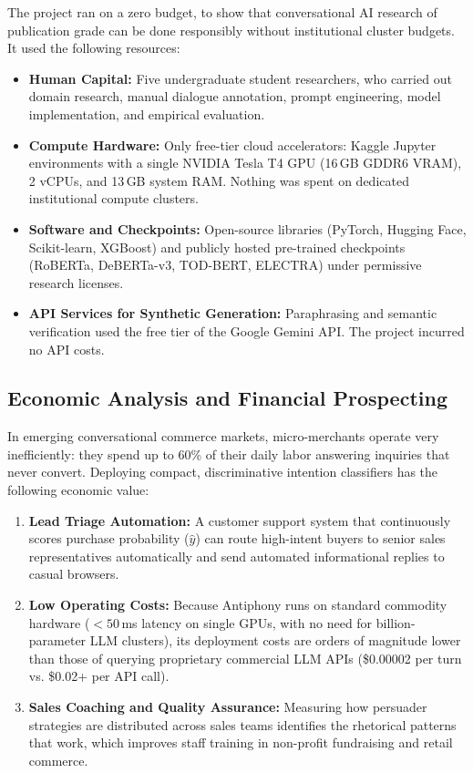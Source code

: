 \begin{keypoint}
The project ran on a zero budget, to show that conversational AI research of publication grade can be done responsibly without institutional cluster budgets. It used the following resources:
\begin{itemize}
  \item \textbf{Human Capital:} Five undergraduate student researchers, who carried out domain research, manual dialogue annotation, prompt engineering, model implementation, and empirical evaluation.
  \item \textbf{Compute Hardware:} Only free-tier cloud accelerators: Kaggle Jupyter environments with a single NVIDIA Tesla T4 GPU (16\,GB GDDR6 VRAM), 2 vCPUs, and 13\,GB system RAM. Nothing was spent on dedicated institutional compute clusters.
  \item \textbf{Software and Checkpoints:} Open-source libraries (PyTorch, Hugging Face, Scikit-learn, XGBoost) and publicly hosted pre-trained checkpoints (RoBERTa, DeBERTa-v3, TOD-BERT, ELECTRA) under permissive research licenses.
  \item \textbf{API Services for Synthetic Generation:} Paraphrasing and semantic verification used the free tier of the Google Gemini API. The project incurred no API costs.
\end{itemize}
\end{keypoint}

\subsection{Economic Analysis and Financial Prospecting}
\label{sec:economics}

In emerging conversational commerce markets, micro-merchants operate very inefficiently: they spend up to 60\% of their daily labor answering inquiries that never convert. Deploying compact, discriminative intention classifiers has the following economic value:
\begin{enumerate}
  \item \textbf{Lead Triage Automation:} A customer support system that continuously scores purchase probability ($\hat{y}$) can route high-intent buyers to senior sales representatives automatically and send automated informational replies to casual browsers.
  \item \textbf{Low Operating Costs:} Because Antiphony runs on standard commodity hardware ($<50$\,ms latency on single GPUs, with no need for billion-parameter LLM clusters), its deployment costs are orders of magnitude lower than those of querying proprietary commercial LLM APIs (\$0.00002 per turn vs. \$0.02+ per API call).
  \item \textbf{Sales Coaching and Quality Assurance:} Measuring how persuader strategies are distributed across sales teams identifies the rhetorical patterns that work, which improves staff training in non-profit fundraising and retail commerce.
\end{enumerate}

